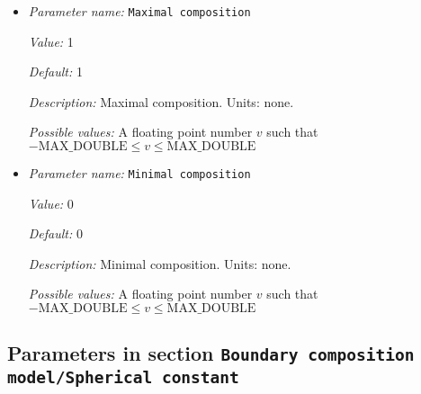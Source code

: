 \begin{itemize}
\item {\it Parameter name:} {\tt Maximal composition}
\label{parameters:Boundary composition model/Initial composition/Maximal composition}


{\it Value:} 1


{\it Default:} 1


{\it Description:} Maximal composition. Units: none.


{\it Possible values:} A floating point number $v$ such that $-\text{MAX\_DOUBLE} \leq v \leq \text{MAX\_DOUBLE}$
\item {\it Parameter name:} {\tt Minimal composition}
\label{parameters:Boundary composition model/Initial composition/Minimal composition}


{\it Value:} 0


{\it Default:} 0


{\it Description:} Minimal composition. Units: none.


{\it Possible values:} A floating point number $v$ such that $-\text{MAX\_DOUBLE} \leq v \leq \text{MAX\_DOUBLE}$
\end{itemize}

\subsection{Parameters in section \tt Boundary composition model/Spherical constant}
\label{parameters:Boundary_20composition_20model/Spherical_20constant}

